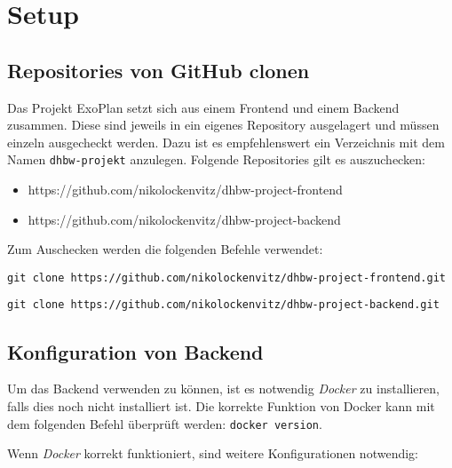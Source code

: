 \section{Setup}
\subsection{Repositories von GitHub clonen}

Das Projekt ExoPlan setzt sich aus einem Frontend und einem Backend zusammen. Diese sind jeweils in ein eigenes Repository ausgelagert und müssen einzeln ausgecheckt werden. Dazu ist es empfehlenswert ein Verzeichnis mit dem Namen \texttt{dhbw-projekt} anzulegen. Folgende Repositories gilt es auszuchecken:
\begin{itemize}
	\item https://github.com/nikolockenvitz/dhbw-project-frontend
	\item https://github.com/nikolockenvitz/dhbw-project-backend
\end{itemize}

Zum Auschecken werden die folgenden Befehle verwendet:

\texttt{git clone https://github.com/nikolockenvitz/dhbw-project-frontend.git}

\texttt{git clone https://github.com/nikolockenvitz/dhbw-project-backend.git}

\subsection{Konfiguration von Backend}

Um das Backend verwenden zu können, ist es notwendig \textit{Docker} zu installieren, falls dies noch nicht installiert ist. Die korrekte Funktion von Docker kann mit dem folgenden Befehl überprüft werden: \texttt{docker version}.

Wenn \textit{Docker} korrekt funktioniert, sind weitere Konfigurationen notwendig:

